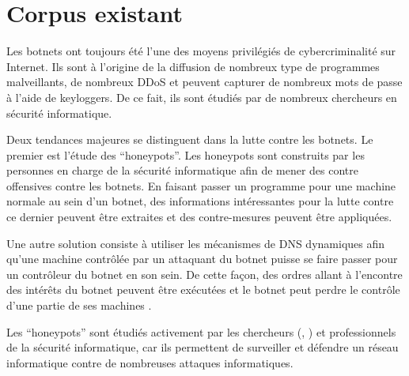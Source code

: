 \section{Corpus existant}

Les botnets ont toujours été l'une des moyens privilégiés de cybercriminalité
sur Internet. Ils sont à l'origine de la diffusion de nombreux type de
programmes malveillants, de nombreux DDoS et peuvent capturer de nombreux mots
de passe à l'aide de keyloggers. De ce fait, ils sont étudiés par de nombreux
chercheurs en sécurité informatique.

Deux tendances majeures se distinguent dans la lutte contre les botnets.
Le premier est l'étude des ``honeypots''. Les honeypots sont construits par les
personnes en charge de la sécurité informatique afin de mener des contre offensives
contre les botnets. En faisant passer un programme pour une machine normale au sein
d'un botnet, des informations intéressantes pour la lutte contre ce dernier peuvent
être extraites et des contre-mesures peuvent être appliquées.

Une autre solution consiste à utiliser les mécanismes de DNS dynamiques
afin qu'une machine contrôlée par un attaquant du botnet puisse se faire
passer pour un contrôleur du botnet en son sein. De cette façon, des ordres
allant à l'encontre des intérêts du botnet peuvent être exécutées et le botnet
peut perdre le contrôle d'une partie de ses machines \cite{botnet-timezone}.

Les ``honeypots'' sont étudiés activement par les chercheurs
(\cite{honeypot-framework}, \cite{honeypot-hybrid}) et professionnels de
la sécurité informatique, car ils permettent de surveiller et défendre
un réseau informatique contre de nombreuses attaques informatiques.
